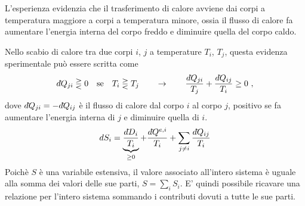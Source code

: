 \documentclass[letterpaper,10pt,english]{jupyterBook}
\begin{document}
\sphinxAtStartPar
L’esperienza evidenzia che il trasferimento di calore avviene dai corpi a temperatura maggiore a corpi a temperatura minore, ossia il flusso di calore fa aumentare l’energia interna del corpo freddo e diminuire quella del corpo caldo.

\sphinxAtStartPar
Nello scabio di calore tra due corpi \(i\), \(j\) a temperature \(T_i\), \(T_j\), questa evidenza sperimentale può essere scritta come
\begin{equation*}
\begin{split}d\hspace{-0.08pt}\bar{}\hspace{0.1pt} Q_{ji} \gtreqless 0 \quad \text{se} \quad T_i \gtreqless T_j \qquad \rightarrow \qquad \dfrac{d\hspace{-0.08pt}\bar{}\hspace{0.1pt} Q_{ji}}{T_j} + \dfrac{d\hspace{-0.08pt}\bar{}\hspace{0.1pt} Q_{ij}}{T_i} \ge 0 \ ,\end{split}
\end{equation*}
\sphinxAtStartPar
dove \(d\hspace{-0.08pt}\bar{}\hspace{0.1pt} Q_{ji} = - d\hspace{-0.08pt}\bar{}\hspace{0.1pt} Q_{ij}\) è il flusso di calore dal corpo \(i\) al corpo \(j\), positivo se fa aumentare l’energia interna di \(j\) e diminuire quella di \(i\).
\begin{equation*}
\begin{split}d S_i = \underbrace{\dfrac{d\hspace{-0.08pt}\bar{}\hspace{0.1pt}  D_i}{T_i}}_{\ge 0} + \dfrac{d\hspace{-0.08pt}\bar{}\hspace{0.1pt}  Q^{e,i}}{T_i} + \sum_{j \ne i} \dfrac{d\hspace{-0.08pt}\bar{}\hspace{0.1pt}  Q_{ij}}{T_i}\end{split}
\end{equation*}
\sphinxAtStartPar
Poichè \(S\) è una variabile estensiva, il valore associato all’intero sistema è uguale alla somma dei valori delle sue parti, \(S = \sum_i S_i\). E’ quindi possibile ricavare una relazione per l’intero sistema sommando i contributi dovuti a tutte le sue parti.
\end{document}
